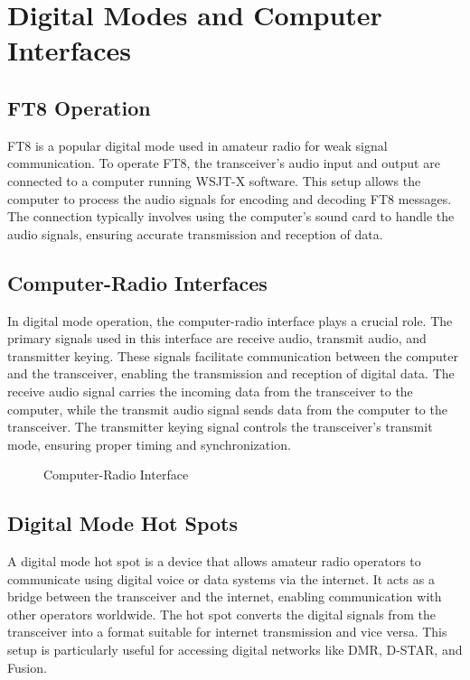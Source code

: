 \section{Digital Modes and Computer Interfaces}
\label{section:digital_modes_and_interfaces}

\subsection*{FT8 Operation}
FT8 is a popular digital mode used in amateur radio for weak signal communication. To operate FT8, the transceiver's audio input and output are connected to a computer running WSJT-X software. This setup allows the computer to process the audio signals for encoding and decoding FT8 messages. The connection typically involves using the computer's sound card to handle the audio signals, ensuring accurate transmission and reception of data.

\subsection*{Computer-Radio Interfaces}
In digital mode operation, the computer-radio interface plays a crucial role. The primary signals used in this interface are receive audio, transmit audio, and transmitter keying. These signals facilitate communication between the computer and the transceiver, enabling the transmission and reception of digital data. The receive audio signal carries the incoming data from the transceiver to the computer, while the transmit audio signal sends data from the computer to the transceiver. The transmitter keying signal controls the transceiver's transmit mode, ensuring proper timing and synchronization.

\begin{figure}[h]
    \centering
    \caption{Computer-Radio Interface}
    \label{fig:computer_radio_interface}
\end{figure}

\subsection*{Digital Mode Hot Spots}
A digital mode hot spot is a device that allows amateur radio operators to communicate using digital voice or data systems via the internet. It acts as a bridge between the transceiver and the internet, enabling communication with other operators worldwide. The hot spot converts the digital signals from the transceiver into a format suitable for internet transmission and vice versa. This setup is particularly useful for accessing digital networks like DMR, D-STAR, and Fusion.

